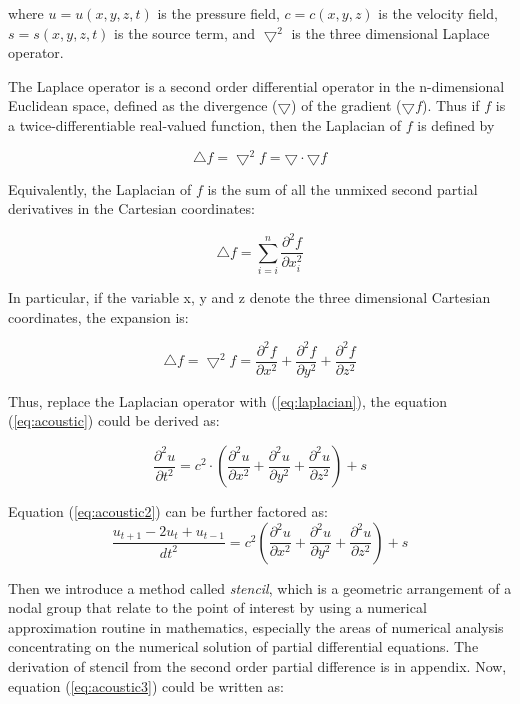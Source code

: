 where \( u = u(x, y, z, t) \) is the pressure field, \(c = c(x, y, z) \) is
the velocity field, \( s = s(x, y, z, t) \) is the source term, and \(
\bigtriangledown ^2 \) is the three dimensional Laplace operator.

The Laplace operator is a second order differential operator in the n-dimensional
Euclidean space, defined as the divergence (\( \bigtriangledown \)) of the gradient
(\( \bigtriangledown f\)). Thus if \( f \) is a twice-differentiable real-valued
function, then the Laplacian of \( f \) is defined by

\[
  \bigtriangleup f = \bigtriangledown ^2 f = \bigtriangledown \cdot
  \bigtriangledown f
\]

Equivalently, the Laplacian of \( f \) is the sum of all the unmixed second
partial derivatives in the Cartesian coordinates:

\[
  \bigtriangleup f = \sum _{i=i} ^n \frac{\partial ^2 f}{\partial x_i ^2}
\]

In particular, if the variable x, y and z denote the three dimensional
Cartesian coordinates, the expansion is:

\begin{equation}
  \bigtriangleup f  = \bigtriangledown ^2 f = \frac{ \partial ^2 f}{\partial x^2} +
                     \frac{ \partial ^2 f}{\partial y^2} +
                     \frac{ \partial ^2 f}{\partial z^2}
  \label{eq:laplacian}
\end{equation}

Thus, replace the Laplacian operator with (\ref{eq:laplacian}), the
equation (\ref{eq:acoustic}) could be derived as:

\begin{equation}
  \frac{\partial ^2u}{\partial t^2}=
  c^2\cdot\left(
  \frac{ \partial ^2 u}{\partial x^2} +
  \frac{ \partial ^2 u}{\partial y^2} +
  \frac{ \partial ^2 u}{\partial z^2}
  \right)
  +s
  \label{eq:acoustic2}
\end{equation}

Equation (\ref{eq:acoustic2}) can be further factored as:
\begin{equation}
  \frac{u_{t+1} - 2u_{t} + u_{t-1}}{dt^2}=
  c^2\left(
  \frac{ \partial ^2 u}{\partial x^2} +
  \frac{ \partial ^2 u}{\partial y^2} +
  \frac{ \partial ^2 u}{\partial z^2}
   \right)
  +s
  \label{eq:acoustic3}
\end{equation}

Then we introduce a method called \emph{stencil}, which is a geometric
arrangement of a nodal group that relate to the point of interest by using
a numerical approximation routine in mathematics, especially the areas of
numerical analysis concentrating on the numerical solution of partial
differential equations. The derivation of stencil from the second order
partial difference is in appendix. Now, equation (\ref{eq:acoustic3}) could
be written as:


